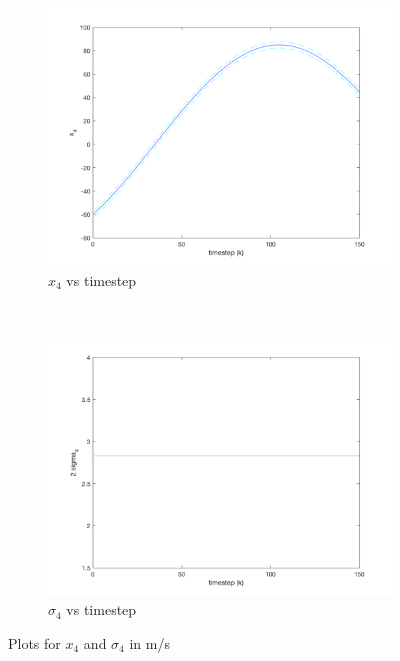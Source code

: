 \documentclass[11pt]{article}
\begin{document}
\begin{figure}
\centering
\begin{subfigure}[b]{.45\textwidth}
	\centering
	\includegraphics[width=\textwidth]{p1_plt7.png}
	\caption{$x_4$ vs timestep}
	\label{x4}
\end{subfigure}
~
\begin{subfigure}[b]{.45\textwidth}
	\centering
	\includegraphics[width=\textwidth]{p1_plt8.png}
	\caption{$\sigma_4$ vs timestep}
	\label{sigma4}
\end{subfigure}
\caption{Plots for $x_4$ and $\sigma_4$ in m/s}
\label{x4plots}
\end{figure}
\end{document}
